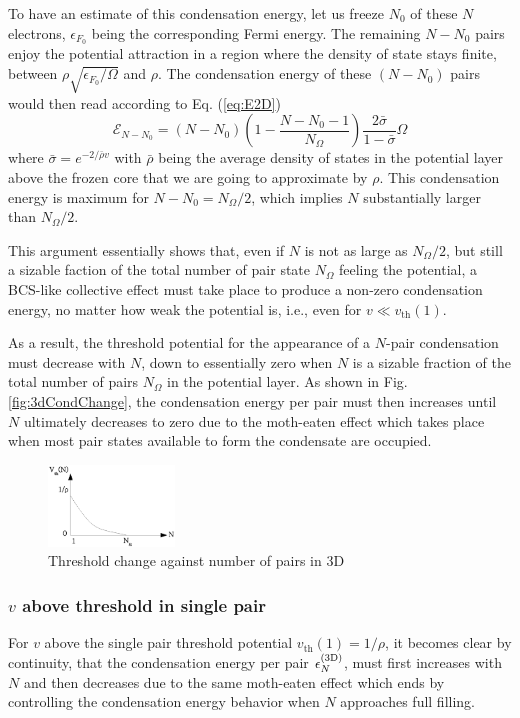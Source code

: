 \documentclass[3p,twocolumn]{elsarticle}
\begin{document}
To have an estimate of this condensation energy, let us freeze $N_0$ of these $N$ electrons, $\epsilon_{F_{0}}$ being the corresponding Fermi energy.  The remaining $N-N_0$ pairs enjoy the potential attraction in a region where the density of state stays finite, between $\rho\sqrt{\epsilon_{F_0}/\Omega}$ and $\rho$.  The condensation energy of these $(N-N_0)$ pairs would then read according to Eq. (\ref{eq:E2D})
\begin{equation}\label{eq:E3D}
{\mathcal{E}}_{N-N_0}=(N-N_0)(1-\frac{N-N_0-1}{N_\Omega})\frac{2\bar\sigma}{1-\bar\sigma}\Omega
\end{equation}
where $\bar{\sigma}=e^{-2/{\bar{\rho}v}}$ with $\bar\rho$ being the average density of states in the potential layer above the frozen core that we are going to approximate by $\rho$. This condensation energy is maximum for $N-N_0=N_\Omega/2$, which implies  $N$ substantially larger than $N_\Omega/2$.

This argument essentially shows that, even if $N$ is not as large as $N_\Omega/2$, but still a sizable faction of the total number of pair state $N_\Omega$ feeling the potential,  a BCS-like collective effect  must take place to produce a non-zero condensation energy, no matter how weak the potential is, i.e., even for $v\ll{}v_\text{th}(1)$. 

As a result, the threshold potential for the appearance of a $N$-pair condensation  must decrease with $N$, down to essentially zero when $N$ is a sizable fraction of the total number of pairs $N_\Omega$ in the potential layer.  As shown in Fig. \ref{fig:3dCondChange}, the condensation energy per pair must then increases until $N$ ultimately decreases to zero due to the moth-eaten effect which takes place when most pair states available to form the condensate are occupied. 


\begin{figure}[htb]
	\centering
		\includegraphics[width=0.30\textwidth]{3dThresholdChange.eps}
	\caption{Threshold change against number of pairs in 3D}
	\label{fig:3dThresholdChange}
\end{figure}

\subsubsection{$v$ above threshold in single pair}
For $v$ above the single pair threshold potential $v_{\text{th}}(1)=1/\rho$, it becomes  clear by continuity, that the condensation energy per pair $\epsilon^{{\text{(3D)}}}_N$, must first increases with $N$ and then decreases due to the same moth-eaten effect which ends by controlling the condensation energy behavior when $N$ approaches full filling.  
\end{document}
